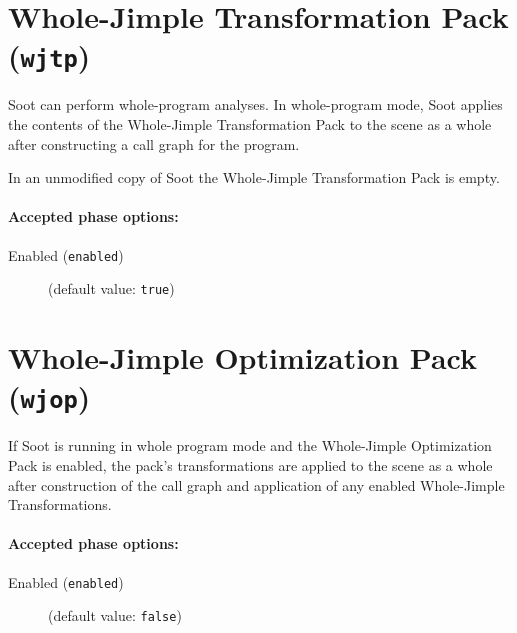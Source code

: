 \documentclass{article}
\begin{document}
\section{Whole-Jimple Transformation Pack ({\tt wjtp})}


\par

Soot can perform whole-program analyses.  In whole-program mode,
Soot applies the contents of the Whole-Jimple Transformation Pack
to the scene as a whole after constructing a call graph for the
program.

\par

In an unmodified copy of Soot the Whole-Jimple Transformation
Pack is empty.
                        

\paragraph{Accepted phase options:} 

\begin{description}

\item[Enabled ({\tt enabled})]
(default value: {\tt true})






\end{description}

\section{Whole-Jimple Optimization Pack ({\tt wjop})}


\par

If Soot is running in whole program mode and the Whole-Jimple
Optimization Pack is enabled, the pack's transformations are
applied to the scene as a whole after construction of the call
graph and application of any enabled Whole-Jimple
Transformations.
                        

\paragraph{Accepted phase options:} 

\begin{description}

\item[Enabled ({\tt enabled})]
(default value: {\tt false})






\end{description}
\end{document}
